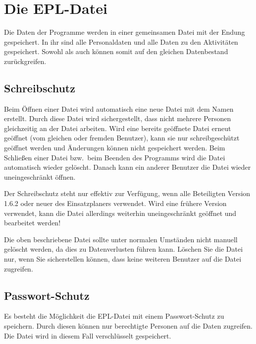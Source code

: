 \section{Die EPL-Datei}\label{epl:allg:datei}
Die Daten der Programme werden in einer gemeinsamen Datei mit der Endung  gespeichert.
In ihr sind alle Personaldaten und alle Daten zu den Aktivitäten gespeichert.
Sowohl \Personal als auch \Einsatz können somit auf den gleichen Datenbestand zurückgreifen.

\subsection{Schreibschutz}\label{epl:allg:datei:schreibschutz}
Beim Öffnen einer Datei  wird automatisch eine neue Datei mit dem Namen  erstellt.
Durch diese Datei wird sichergestellt, dass nicht mehrere Personen gleichzeitig an der Datei  arbeiten.
Wird eine bereits geöffnete Datei erneut geöffnet (vom gleichen oder fremden Benutzer),
kann sie nur schreibgeschützt geöffnet werden und Änderungen können nicht gespeichert werden.
Beim Schließen einer Datei bzw.\ beim Beenden des Programms wird die Datei  automatisch wieder gelöscht.
Danach kann ein anderer Benutzer die Datei  wieder uneingeschränkt öffnen.

\begin{hinweis}
  Der Schreibschutz steht nur effektiv zur Verfügung, wenn alle Beteiligten Version 1.6.2 oder neuer des Einsatzplaners verwendet.
  Wird eine frühere Version verwendet, kann die Datei allerdings weiterhin uneingeschränkt geöffnet und bearbeitet werden!
\end{hinweis}


\begin{hinweis}
  Die oben beschriebene Datei sollte unter normalen Umständen nicht manuell gelöscht werden, da dies zu Datenverlusten führen kann.
  Löschen Sie die Datei nur, wenn Sie sicherstellen können, dass keine weiteren Benutzer auf die Datei zugreifen.
\end{hinweis}


\subsection{Passwort-Schutz}\label{epl:allg:datei:passwort}
Es besteht die Möglichkeit die EPL-Datei mit einem Passwort-Schutz zu speichern.
Durch diesen können nur berechtigte Personen auf die Daten zugreifen.
Die Datei wird in diesem Fall verschlüsselt gespeichert.

